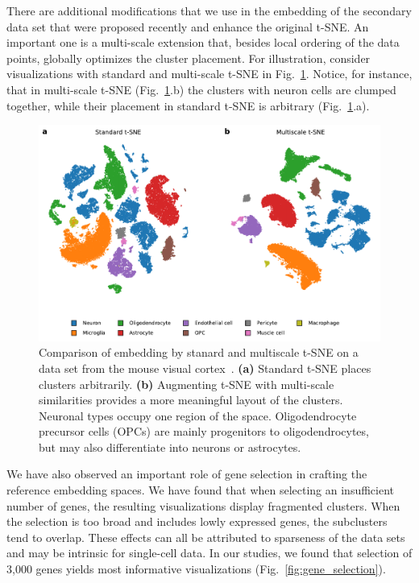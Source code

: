 \documentclass[runningheads]{llncs}
\begin{document}
There are additional modifications that we use in the embedding of the
secondary data set that were proposed recently and enhance the original t-SNE.
An important one is a multi-scale extension that, besides local ordering of the
data points, globally optimizes the cluster placement. For
illustration, consider visualizations with standard and multi-scale t-SNE in
Fig.~\ref{fig:multiscale}. Notice, for instance, that in multi-scale t-SNE
(Fig.~\ref{fig:multiscale}.b) the clusters with neuron cells are clumped
together, while their placement in standard t-SNE is arbitrary
(Fig.~\ref{fig:multiscale}.a).


\begin{figure}[htbp]
\includegraphics[width=\textwidth]{figures/hrvatin_multiscale_tsne.pdf}
\caption{Comparison of embedding by stanard and multiscale t-SNE on a data set
from the mouse visual cortex~\cite{hrvatin2018}. {\bf (a)} Standard t-SNE
places clusters arbitrarily. {\bf (b)} Augmenting t-SNE with multi-scale
similarities provides a more meaningful layout of the clusters. Neuronal types
occupy one region of the space. Oligodendrocyte precursor cells (OPCs) are
mainly progenitors to oligodendrocytes, but may also differentiate into neurons
or astrocytes.} \label{fig:multiscale}
\end{figure}

We have also observed an important role of gene selection in crafting the
reference embedding spaces. We have found that when selecting an insufficient
number of genes, the resulting visualizations display fragmented clusters. When
the selection is too broad and includes lowly expressed genes, the subclusters
tend to overlap. These effects can all be attributed to sparseness of the data
sets and may be intrinsic for single-cell data. In our studies, we found that
selection of 3,000 genes yields most informative visualizations
(Fig.~\ref{fig:gene_selection}).
\end{document}

